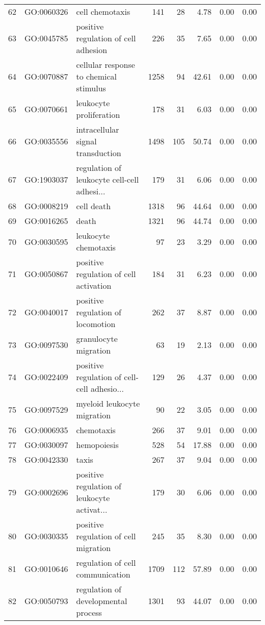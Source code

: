 \begin{table}[ht]
\begin{tabular}{rllrrrrr}
  62 & GO:0060326 & cell chemotaxis & 141 &  28 & 4.78 & 0.00 & 0.00 \\ 
  63 & GO:0045785 & positive regulation of cell adhesion & 226 &  35 & 7.65 & 0.00 & 0.00 \\ 
  64 & GO:0070887 & cellular response to chemical stimulus & 1258 &  94 & 42.61 & 0.00 & 0.00 \\ 
  65 & GO:0070661 & leukocyte proliferation & 178 &  31 & 6.03 & 0.00 & 0.00 \\ 
  66 & GO:0035556 & intracellular signal transduction & 1498 & 105 & 50.74 & 0.00 & 0.00 \\ 
  67 & GO:1903037 & regulation of leukocyte cell-cell adhesi... & 179 &  31 & 6.06 & 0.00 & 0.00 \\ 
  68 & GO:0008219 & cell death & 1318 &  96 & 44.64 & 0.00 & 0.00 \\ 
  69 & GO:0016265 & death & 1321 &  96 & 44.74 & 0.00 & 0.00 \\ 
  70 & GO:0030595 & leukocyte chemotaxis &  97 &  23 & 3.29 & 0.00 & 0.00 \\ 
  71 & GO:0050867 & positive regulation of cell activation & 184 &  31 & 6.23 & 0.00 & 0.00 \\ 
  72 & GO:0040017 & positive regulation of locomotion & 262 &  37 & 8.87 & 0.00 & 0.00 \\ 
  73 & GO:0097530 & granulocyte migration &  63 &  19 & 2.13 & 0.00 & 0.00 \\ 
  74 & GO:0022409 & positive regulation of cell-cell adhesio... & 129 &  26 & 4.37 & 0.00 & 0.00 \\ 
  75 & GO:0097529 & myeloid leukocyte migration &  90 &  22 & 3.05 & 0.00 & 0.00 \\ 
  76 & GO:0006935 & chemotaxis & 266 &  37 & 9.01 & 0.00 & 0.00 \\ 
  77 & GO:0030097 & hemopoiesis & 528 &  54 & 17.88 & 0.00 & 0.00 \\ 
  78 & GO:0042330 & taxis & 267 &  37 & 9.04 & 0.00 & 0.00 \\ 
  79 & GO:0002696 & positive regulation of leukocyte activat... & 179 &  30 & 6.06 & 0.00 & 0.00 \\ 
  80 & GO:0030335 & positive regulation of cell migration & 245 &  35 & 8.30 & 0.00 & 0.00 \\ 
  81 & GO:0010646 & regulation of cell communication & 1709 & 112 & 57.89 & 0.00 & 0.00 \\ 
  82 & GO:0050793 & regulation of developmental process & 1301 &  93 & 44.07 & 0.00 & 0.00 \\ 

\end{tabular}
\end{table}
